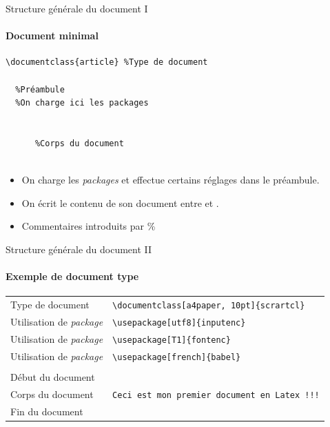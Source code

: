 \begin{frame}[fragile,label=frame:structure]{Structure générale du document I}

  \framesubtitle{Document minimal}
  \small

  \begin{lstlisting}[style=nonumbers]
  \documentclass{article} %Type de document

  %Préambule
  %On charge ici les packages

  
      %Corps du document
  
  \end{lstlisting}
  \begin{itemize}
      \item On charge les \textit{packages} et effectue certains réglages dans le préambule.
      \item On écrit le contenu de son document entre \lstinline|| et \lstinline||.
      \item Commentaires introduits par \%
  \end{itemize}

\end{frame}

\begin{frame}[fragile]{Structure générale du document II}

  \framesubtitle{Exemple de document type}
  \small
  \begin{tabular}{ll}
    Type de document &
    \lstinline|\documentclass[a4paper, 10pt]{scrartcl}|\\
    Utilisation de \textit{package} &
    \lstinline|\usepackage[utf8]{inputenc}|\\
    Utilisation de \textit{package} &
    \lstinline|\usepackage[T1]{fontenc}|\\
    Utilisation de \textit{package} &
    \lstinline|\usepackage[french]{babel}|\\
     &\\
    Début du document &
    \lstinline||\\
    Corps du document &
    \lstinline|Ceci est mon premier document en Latex !!!|\\
    Fin du document &
    \lstinline||\\
  \end{tabular}
\end{frame}

